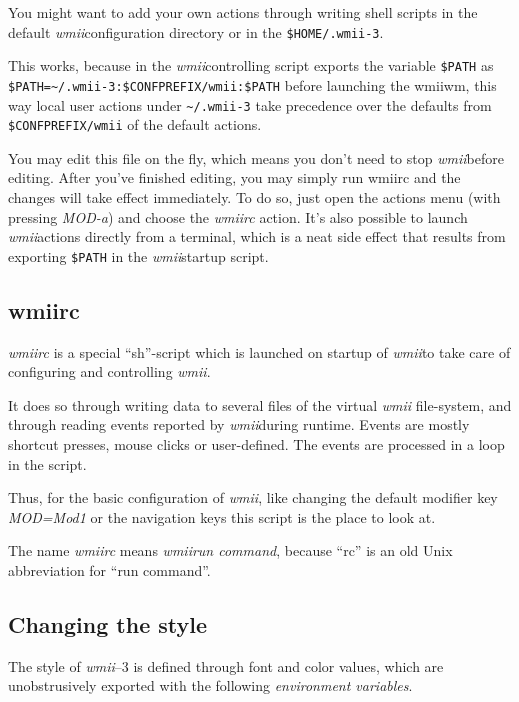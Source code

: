\documentclass[12pt,a4paper]{article} %
\newcommand{\wmii}{\emph{wmii}}
\begin{document}
    You might want to add your own actions through writing shell scripts in the
    default \wmii configuration directory or in the \texttt{\$HOME/.wmii-3}.
    
    This works, because in the \wmii controlling script exports the variable
    \verb+$PATH+ as\\ \verb+$PATH=~/.wmii-3:$CONFPREFIX/wmii:$PATH+ before
    launching the wmiiwm, this way local user actions under
    \verb+~/.wmii-3+ take precedence over the defaults from
    \verb+$CONFPREFIX/wmii+ of the default actions.
    
    You may edit this file on the fly, which means you don't need to
    stop \wmii before editing. After you've finished editing, you may
    simply run wmiirc and the changes will take effect immediately.
    To do so, just open the actions menu (with pressing \emph{MOD-a}) and
    choose the \emph{wmiirc} action. It's also possible to launch \wmii actions
    directly from a terminal, which is a neat side effect that results from
    exporting \verb+$PATH+ in the \wmii startup script.

    \subsection{wmiirc}
    
    \emph{wmiirc} is a special ``sh''-script which is launched on startup
    of \wmii to take care of configuring and controlling \wmii.

    It does so through writing data to several files of the virtual \wmii
    file-system, and through reading events reported by \wmii during runtime.
    Events are mostly shortcut presses, mouse clicks or user-defined.
    The events are processed in a loop in the script.
    
    Thus, for the basic configuration of \wmii, like changing the default
    modifier key \emph{MOD=Mod1} or the navigation keys this script is
    the place to look at.

    The name \emph{wmiirc} means \wmii \emph{run command}, because ``rc'' is an
    old Unix abbreviation for ``run command''.

    \subsection{Changing the style}

    The style of \wmii --3 is defined through font and color values, which are
    unobstrusively exported with the following \emph{environment variables}.
\end{document}
